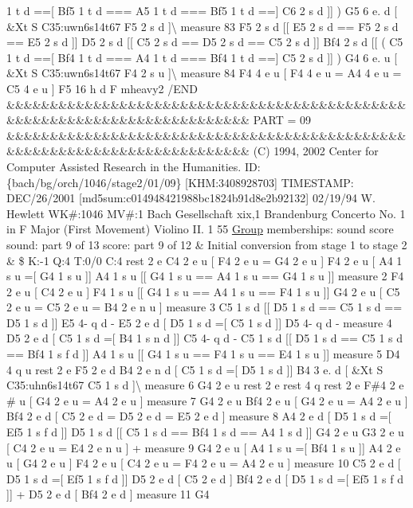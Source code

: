 1 t d ==\mbox{[} Bf5 1 t d === A5 1 t d === Bf5 1 t d ==\mbox{]} C6 2 s d \mbox{]}\mbox{]} ) G5 6 e. d \mbox{[} \&Xt S C35\+:uwn6s14t67 F5 2 s d \mbox{]}\textbackslash{} measure 83 F5 2 s d \mbox{[}\mbox{[} E5 2 s d == F5 2 s d == E5 2 s d \mbox{]}\mbox{]} D5 2 s d \mbox{[}\mbox{[} C5 2 s d == D5 2 s d == C5 2 s d \mbox{]}\mbox{]} Bf4 2 s d \mbox{[}\mbox{[} ( C5 1 t d ==\mbox{[} Bf4 1 t d === A4 1 t d === Bf4 1 t d ==\mbox{]} C5 2 s d \mbox{]}\mbox{]} ) G4 6 e. u \mbox{[} \&Xt S C35\+:uwn6s14t67 F4 2 s u \mbox{]}\textbackslash{} measure 84 F4 4 e u \mbox{[} F4 4 e u = A4 4 e u = C5 4 e u \mbox{]} F5 16 h d F mheavy2 /\+E\+ND \&\&\&\&\&\&\&\&\&\&\&\&\&\&\&\&\&\&\&\&\&\&\&\&\&\&\&\&\&\&\&\&\&\&\&\&\&\&\&\&\&\&\&\&\&\&\&\&\&\&\&\&\&\&\&\&\&\&\&\&\&\&\&\&\&\&\&\&\&\&\&\&\&\& P\+A\+RT = 09 \&\&\&\&\&\&\&\&\&\&\&\&\&\&\&\&\&\&\&\&\&\&\&\&\&\&\&\&\&\&\&\&\&\&\&\&\&\&\&\&\&\&\&\&\&\&\&\&\&\&\&\&\&\&\&\&\&\&\&\&\&\&\&\&\&\&\&\&\&\&\&\&\&\& (C) 1994, 2002 Center for Computer Assisted Research in the Humanities. ID\+: \{bach/bg/orch/1046/stage2/01/09\} \mbox{[}K\+HM\+:3408928703\mbox{]} T\+I\+M\+E\+S\+T\+A\+MP\+: D\+E\+C/26/2001 \mbox{[}md5sum\+:c014948421988bc1824b91d8e2b92132\mbox{]} 02/19/94 W. Hewlett WK\#\+:1046 MV\#\+:1 Bach Gesellschaft xix,1 Brandenburg Concerto No. 1 in F Major (First Movement) Violino II. 1 55 \hyperlink{class_group}{Group} memberships\+: sound score sound\+: part 9 of 13 score\+: part 9 of 12 \& Initial conversion from stage 1 to stage 2 \& \$ K\+:-\/1 Q\+:4 T\+:0/0 C\+:4 rest 2 e C4 2 e u \mbox{[} F4 2 e u = G4 2 e u \mbox{]} F4 2 e u \mbox{[} A4 1 s u =\mbox{[} G4 1 s u \mbox{]}\mbox{]} A4 1 s u \mbox{[}\mbox{[} G4 1 s u == A4 1 s u == G4 1 s u \mbox{]}\mbox{]} measure 2 F4 2 e u \mbox{[} C4 2 e u \mbox{]} F4 1 s u \mbox{[}\mbox{[} G4 1 s u == A4 1 s u == F4 1 s u \mbox{]}\mbox{]} G4 2 e u \mbox{[} C5 2 e u = C5 2 e u = B4 2 e n u \mbox{]} measure 3 C5 1 s d \mbox{[}\mbox{[} D5 1 s d == C5 1 s d == D5 1 s d \mbox{]}\mbox{]} E5 4-\/ q d -\/ E5 2 e d \mbox{[} D5 1 s d =\mbox{[} C5 1 s d \mbox{]}\mbox{]} D5 4-\/ q d -\/ measure 4 D5 2 e d \mbox{[} C5 1 s d =\mbox{[} B4 1 s n d \mbox{]}\mbox{]} C5 4-\/ q d -\/ C5 1 s d \mbox{[}\mbox{[} D5 1 s d == C5 1 s d == Bf4 1 s f d \mbox{]}\mbox{]} A4 1 s u \mbox{[}\mbox{[} G4 1 s u == F4 1 s u == E4 1 s u \mbox{]}\mbox{]} measure 5 D4 4 q u rest 2 e F5 2 e d B4 2 e n d \mbox{[} C5 1 s d =\mbox{[} D5 1 s d \mbox{]}\mbox{]} B4 3 e. d \mbox{[} \&Xt S C35\+:uhn6s14t67 C5 1 s d \mbox{]}\textbackslash{} measure 6 G4 2 e u rest 2 e rest 4 q rest 2 e F\#4 2 e \# u \mbox{[} G4 2 e u = A4 2 e u \mbox{]} measure 7 G4 2 e u Bf4 2 e u \mbox{[} G4 2 e u = A4 2 e u \mbox{]} Bf4 2 e d \mbox{[} C5 2 e d = D5 2 e d = E5 2 e d \mbox{]} measure 8 A4 2 e d \mbox{[} D5 1 s d =\mbox{[} Ef5 1 s f d \mbox{]}\mbox{]} D5 1 s d \mbox{[}\mbox{[} C5 1 s d == Bf4 1 s d == A4 1 s d \mbox{]}\mbox{]} G4 2 e u G3 2 e u \mbox{[} C4 2 e u = E4 2 e n u \mbox{]} + measure 9 G4 2 e u \mbox{[} A4 1 s u =\mbox{[} Bf4 1 s u \mbox{]}\mbox{]} A4 2 e u \mbox{[} G4 2 e u \mbox{]} F4 2 e u \mbox{[} C4 2 e u = F4 2 e u = A4 2 e u \mbox{]} measure 10 C5 2 e d \mbox{[} D5 1 s d =\mbox{[} Ef5 1 s f d \mbox{]}\mbox{]} D5 2 e d \mbox{[} C5 2 e d \mbox{]} Bf4 2 e d \mbox{[} D5 1 s d =\mbox{[} Ef5 1 s f d \mbox{]}\mbox{]} + D5 2 e d \mbox{[} Bf4 2 e d \mbox{]} measure 11 G4 